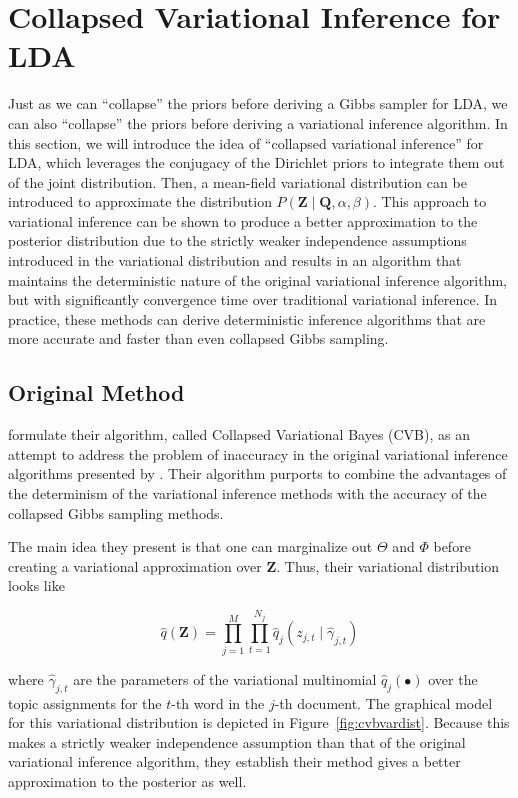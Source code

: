 \documentclass[11pt]{article}
\begin{document}
\section{Collapsed Variational Inference for LDA}
Just as we can ``collapse'' the priors before deriving a Gibbs sampler for
LDA, we can also ``collapse'' the priors before deriving a variational
inference algorithm. In this section, we will introduce the idea of
``collapsed variational inference'' for LDA, which leverages the conjugacy
of the Dirichlet priors to integrate them out of the joint distribution.
Then, a mean-field variational distribution can be introduced to
approximate the distribution $P(\mathbf{Z} \mid \mathbf{Q}, \alpha,
\beta)$. This approach to variational inference can be shown to produce a
better approximation to the posterior distribution due to the strictly
weaker independence assumptions introduced in the variational distribution
and results in an algorithm that maintains the deterministic nature of the
original variational inference algorithm, but with significantly
convergence time over traditional variational inference. In practice, these
methods can derive deterministic inference algorithms that are more
accurate and faster than even collapsed Gibbs sampling.

\subsection{Original Method}

\citet*{Teh:2007:CVB} formulate their algorithm, called Collapsed
Variational Bayes (CVB), as an attempt to address the problem of inaccuracy
in the original variational inference algorithms presented by
\citet{Blei:2003:LDA}. Their algorithm purports to combine the advantages
of the determinism of the variational inference methods with the accuracy
of the collapsed Gibbs sampling methods.

The main idea they present is that one can marginalize out $\Theta$ and
$\Phi$ before creating a variational approximation over $\mathbf{Z}$. Thus,
their variational distribution looks like

\begin{equation}
  \hat{q}(\mathbf{Z}) = \prod_{j=1}^M \prod_{t=1}^{N_j} \hat{q}_j(z_{j,t} \mid
  \hat{\gamma}_{j,t})
\end{equation}

where $\hat{\gamma}_{j,t}$ are the parameters of the variational
multinomial $\hat{q}_j(\bullet)$ over the topic assignments for the $t$-th
word in the $j$-th document. The graphical model for this variational
distribution is depicted in Figure~\ref{fig:cvbvardist}. Because this makes
a strictly weaker independence assumption than that of the original
variational inference algorithm, they establish their method gives a better
approximation to the posterior as well.
\end{document}
